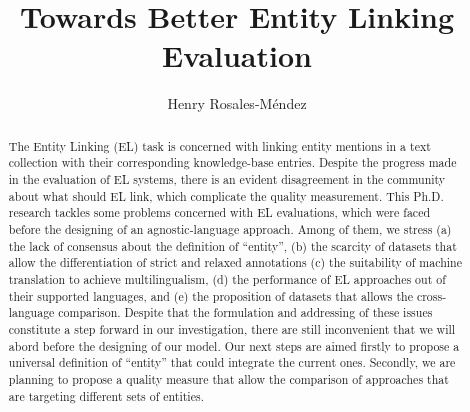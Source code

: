 \documentclass[sigconf]{acmart}
\begin{document}
%
\title{Towards Better Entity Linking Evaluation}

%
\author{Henry Rosales-M\'endez}




%
\renewcommand{\shortauthors}{Rosales-M\'endez et al.}

%
\begin{abstract}
The Entity Linking (EL) task is concerned with linking entity mentions in a text collection with their corresponding knowledge-base entries. Despite the progress made in the evaluation of EL systems, there is an evident disagreement in the community about what should EL link, which complicate the quality measurement. This Ph.D. research tackles some problems concerned with EL evaluations,  which were faced before the designing of an agnostic-language approach. Among of them, we stress (a) the lack of consensus about the definition of ``entity'', (b) the scarcity of datasets that allow the differentiation of strict and relaxed annotations (c) the suitability of machine translation to achieve multilingualism, (d) the performance of EL approaches out of their supported languages, and (e) the proposition of datasets that allows the cross-language comparison. Despite that the formulation and addressing of these issues constitute a step forward in our investigation, there are still inconvenient that we will abord before the designing of our model. Our next steps are aimed firstly to propose a universal definition of ``entity'' that could integrate the current ones. Secondly, we are planning to propose a quality measure that allow the comparison of approaches that are targeting different sets of entities. 
\end{abstract}
\end{document}
